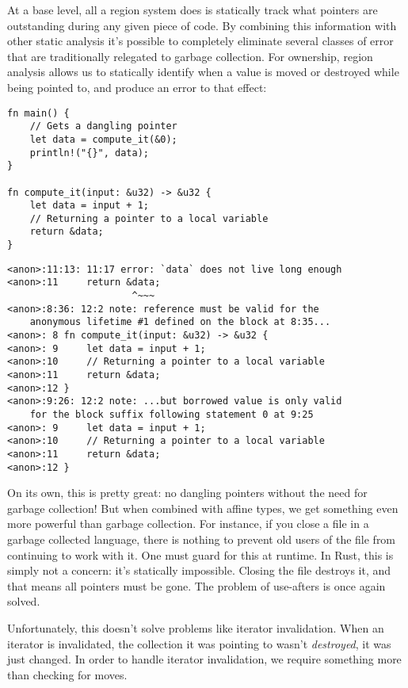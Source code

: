 At a base level, all a region system does is statically track what pointers are
outstanding during any given piece of code. By combining this information with
other static analysis it's possible to completely eliminate several classes of error
that are traditionally relegated to garbage collection. For ownership, region analysis allows us
to statically identify when a value is moved or destroyed while being pointed to,
and produce an error to that effect:

\begin{verbatim}
fn main() {
    // Gets a dangling pointer
    let data = compute_it(&0);
    println!("{}", data);
}

fn compute_it(input: &u32) -> &u32 {
    let data = input + 1;
    // Returning a pointer to a local variable
    return &data;
}
\end{verbatim}

\begin{verbatim}
<anon>:11:13: 11:17 error: `data` does not live long enough
<anon>:11     return &data;
                      ^~~~
<anon>:8:36: 12:2 note: reference must be valid for the
    anonymous lifetime #1 defined on the block at 8:35...
<anon>: 8 fn compute_it(input: &u32) -> &u32 {
<anon>: 9     let data = input + 1;
<anon>:10     // Returning a pointer to a local variable
<anon>:11     return &data;
<anon>:12 }
<anon>:9:26: 12:2 note: ...but borrowed value is only valid
    for the block suffix following statement 0 at 9:25
<anon>: 9     let data = input + 1;
<anon>:10     // Returning a pointer to a local variable
<anon>:11     return &data;
<anon>:12 }
\end{verbatim}

On its own, this is pretty great: no dangling pointers without the need for
garbage collection! But when combined with affine types,
we get something even more powerful than garbage collection. For instance, if
you close a file in a garbage collected language, there is nothing to prevent
old users of the file from continuing to work with it. One must guard for
this at runtime. In Rust, this is simply not a concern:
it's statically impossible. Closing the file destroys it, and that means all
pointers must be gone. The problem of use-afters is once again solved.

Unfortunately, this doesn't solve problems like iterator invalidation. When an
iterator is invalidated, the collection it was pointing to wasn't \emph{destroyed},
it was just changed. In order to handle iterator invalidation, we require something
more than checking for moves.

